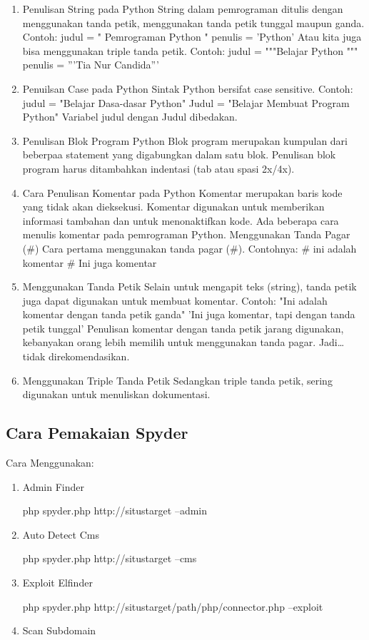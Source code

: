 \documentclass[lipt]{Article}
\begin{document}
\begin{enumerate}
\begin{enumerate}
\item
Penulisan String pada Python
	String dalam pemrograman ditulis dengan menggunakan tanda petik, menggunakan tanda petik tunggal maupun ganda.
Contoh:
judul = " Pemrograman Python "
penulis = 'Python'
Atau kita juga bisa menggunakan triple tanda petik.
Contoh:
judul = """Belajar Python """
penulis = '''Tia Nur Candida'''
\item
Penuilsan Case pada Python
	Sintak Python bersifat case sensitive.
Contoh:
judul = "Belajar Dasa-dasar Python"
Judul = "Belajar Membuat Program Python"
Variabel judul dengan Judul dibedakan.
\item
Penulisan Blok Program Python
	Blok program merupakan kumpulan dari beberpaa statement yang digabungkan dalam satu blok.
Penulisan blok program harus ditambahkan indentasi (tab atau spasi 2x/4x).
\item
Cara Penulisan Komentar pada Python
	Komentar merupakan baris kode yang tidak akan dieksekusi.
Komentar digunakan untuk memberikan informasi tambahan dan untuk menonaktifkan kode.
Ada beberapa cara menulis komentar pada pemrograman Python.
Menggunakan Tanda Pagar (#)
Cara pertama menggunakan tanda pagar (#).
Contohnya:
# ini adalah komentar
# Ini juga komentar
\item
Menggunakan Tanda Petik
Selain untuk mengapit teks (string), tanda petik juga dapat digunakan untuk membuat komentar.
Contoh:
"Ini adalah komentar dengan tanda petik ganda"
'Ini juga komentar, tapi dengan tanda petik tunggal'
Penulisan komentar dengan tanda petik jarang digunakan, kebanyakan orang lebih memilih untuk menggunakan tanda pagar. Jadi…tidak direkomendasikan.
\item
Menggunakan Triple Tanda Petik
Sedangkan triple tanda petik, sering digunakan untuk menuliskan dokumentasi.
\end{enumerate}

\subsection{Cara Pemakaian Spyder}
Cara Menggunakan:
\begin{enumerate}
\item
Admin Finder

php spyder.php http://situstarget –admin
\item
Auto Detect Cms

php spyder.php http://situstarget –cms
\item
Exploit Elfinder

php spyder.php http://situstarget/path/php/connector.php –exploit
\item
Scan Subdomain


\end{enumerate}
\end{enumerate}
\end{document}
